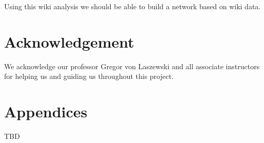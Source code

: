 \documentclass[9pt,twocolumn,twoside]{../../styles/osajnl}
\begin{document}
Using this wiki analysis we should be able to build a network based on wiki data.

\section{Acknowledgement}

We acknowledge our professor Gregor von Laszewski and all associate instructors for helping us and guiding us throughout this project.

\section{Appendices}
TBD



 
\end{document}
